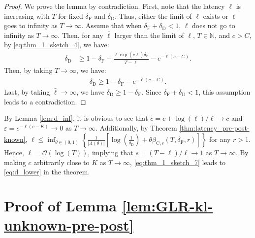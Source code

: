 \documentclass[12pt]{interact}
\newcommand{\lp}{\left(}
\newcommand{\rp}{\right)}
\newcommand{\lb}{\left[}
\newcommand{\rb}{\right]}
\newcommand{\lbp}{\left\{}
\newcommand{\rbp}{\right\}}
\newcommand{\mcal}{\mathcal}
\newcommand{\mrm}{\mathrm}
\newcommand{\mbb}{\mathbb}
\theoremstyle{plain}
\begin{document}
\begin{proof}
We prove the lemma by contradiction. First, note that the latency $\ell$ is increasing with $T$ for fixed $\delta_{\mathrm{F}}$ and $\delta_{\mathrm{D}}$. Thus, either the limit of $\ell$ exists or $\ell$ goes to infinity as $T\rightarrow\infty$. Assume that when $\delta_{\mrm{F}} + \delta_{\mrm{D}} < 1$, $\ell$ does not go to infinity as $T\rightarrow\infty$. Then, for any $\bar{\ell}$ larger than the limit of $\ell$, $T\in\mbb{N}$, and $c>C$, by \eqref{eq:thm_1_sketch_4}, we have:
%
\begin{align}
\delta_{\mathrm{D}}&\geq1-\delta_{\mathrm{F}}-\frac{\bar{\ell}\exp\lp c\bar{\ell}\rp\delta_{\mathrm{F}}}{T-\bar{\ell}}-e^{-\bar{\ell}\lp c-C\rp}.\label{eq:lem_4_proof_1}
\end{align}
%
Then, by taking $T\rightarrow\infty$, we have:
%
\begin{align}
\delta_{\mathrm{D}}\geq1-\delta_{\mathrm{F}}-e^{-\bar{\ell}\lp c-C\rp}.\label{eq:lem_4_proof_2}
\end{align}
%
Last, by taking $\bar{\ell}\rightarrow\infty$, we have $\delta_{\mathrm{D}}\geq1-\delta_{\mathrm{F}}$. Since $\delta_{\mathrm{F}}+\delta_{\mathrm{D}}<1$, this assumption leads to a contradiction.
\end{proof}

By Lemma \ref{lem:d_inf}, it is obvious to see that $\tilde{c} = c + \log\lp\ell\rp/\ell \to c$ and $\varepsilon = e^{-\ell\lp c-K\rp} \to 0$ as $T \to \infty$. 
Additionally, by Theorem \ref{thm:latency_pre-post-known}, $\ell \leq \inf_{\theta\in\lp0,1\rp} \lbp \frac{1}{\lvert\Lambda\lp\theta\rp\rvert} \lb\log\lp\frac{1}{\delta_{\mathrm{D}}}\rp +\theta\beta_{\mrm{C}, r}\lp T, \delta_{\mrm{F}}, r\rp\rb\rbp$ for any $r>1$. Hence, $\ell = \mcal{O}\lp\log\lp T\rp\rp$, implying that $s = \lp T - \ell\rp/\ell \to 1$ as $T \to \infty$. By making $c$ arbitrarily close to $K$ as $T\rightarrow\infty$, \eqref{eq:thm_1_sketch_7} leads to \eqref{eq:d_lower} in the theorem.

\section{Proof of Lemma \ref{lem:GLR-kl-unknown-pre-post}}
\label{sec:lem1}
\end{document}
